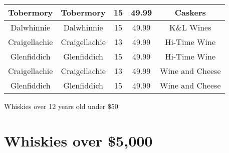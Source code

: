 \begin{appendices}
\begin{center}
\begin{tabular}{||c | c | c | c | c ||}
\hline
Tobermory & Tobermory & 15 & 49.99 & Caskers\\
\hline
Dalwhinnie & Dalwhinnie & 15 & 49.99 & K\&L Wines\\
\hline
Craigellachie & Craigellachie & 13 & 49.99 & Hi-Time Wine\\
\hline
Glenfiddich & Glenfiddich & 15 & 49.99 & Hi-Time Wine\\
\hline
Craigellachie & Craigellachie & 13 & 49.99 & Wine and Cheese\\
\hline
Glenfiddich & Glenfiddich & 15 & 49.99 & Wine and Cheese\\
[1ex]
\hline
\end{tabular}
\label{table:1}
\end{center}
\begin{center}
    Whiskies over 12 years old under \$50
\end{center}

\chapter{Whiskies over \$5,000}


\end{appendices}
